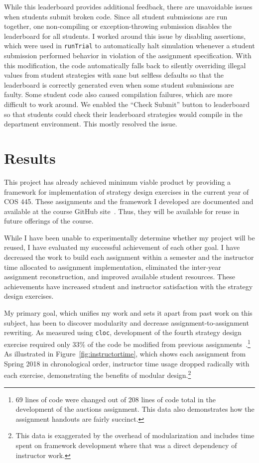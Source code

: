 \documentclass[pageno]{jpaper}
\begin{document}
While this leaderboard provides additional feedback, there are unavoidable issues when students submit broken code.
Since all student submissions are run together, one non-compiling or exception-throwing submission disables the leaderboard for all students.
I worked around this issue by disabling assertions, which were used in \texttt{runTrial} to automatically halt simulation whenever a student submission performed behavior in violation of the assignment specification.
With this modification, the code automatically falls back to silently overriding illegal values from student strategies with sane but selfless defaults so that the leaderboard is correctly generated even when some student submissions are faulty.
Some student code also caused compilation failures, which are more difficult to work around.
We enabled the ``Check Submit'' button to leaderboard so that students could check their leaderboard strategies would compile in the department environment.
This mostly resolved the issue.

\section*{Results}
This project has already achieved minimum viable product by providing a framework for implementation of strategy design exercises in the current year of COS 445.
These assignments and the framework I developed are documented and available at the course GitHub site~\cite{s18}.
Thus, they will be available for reuse in future offerings of the course.

While I have been unable to experimentally determine whether my project will be reused, I have evaluated my successful achievement of each other goal.
I have decreased the work to build each assignment within a semester and the instructor time allocated to assignment implementation, eliminated the inter-year assignment reconstruction, and improved available student resources.
These achievements have increased student and instructor satisfaction with the strategy design exercises.

My primary goal, which unifies my work and sets it apart from past work on this subject, has been to discover modularity and decrease assignment-to-assignment rewriting.
As measured using \texttt{cloc}, development of the fourth strategy design exercise required only 33\% of the code be modified from previous assignments~\cite{s18}.\footnote{69 lines of code were changed out of 208 lines of code total in the development of the auctions assignment. This data also demonstrates how the assignment handouts are fairly succinct.}
As illustrated in Figure~\ref{fig:instructortime}, which shows each assignment from Spring 2018 in chronological order, instructor time usage dropped radically with each exercise, demonstrating the benefits of modular design.\footnote{This data is exaggerated by the overhead of modularization and includes time spent on framework development where that was a direct dependency of instructor work.}
\end{document}
